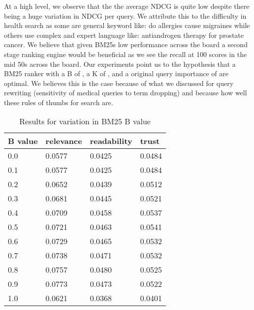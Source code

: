 \documentclass[11pt]{article}
\begin{document}
At a high level, we observe that the the average NDCG is quite low despite there being a huge variation in NDCG per query. We attribute this to the difficulty in health search as some are general keyword like: do allergies cause migraines while others use complex and expert language like: antiandrogen therapy for prostate cancer. We believe that given BM25s low performance across the board a second stage ranking engine would be beneficial as we see the recall at 100 scores in the mid 50s across the board. Our experiments point us to the hypothesis that a BM25 ranker with a B of {}, a K of {}, and a original query importance of {} are optimal. We believes this is the case because of what we discussed for query rewriting (sensitivity of medical queries to term dropping) and because how well these rules of thumbs for search are. 
\begin{table}[]
\begin{tabular}{|l|l|l|l|} \hline
B value  & relevance & readability & trust  \\ \hline
0.0 & 0.0577    & 0.0425     & 0.0484 \\ \hline
0.1 & 0.0577    & 0.0425     & 0.0484 \\\hline
0.2 & 0.0652    & 0.0439     & 0.0512 \\\hline
0.3 & 0.0681    & 0.0445     & 0.0521 \\\hline
0.4  & 0.0709    & 0.0458     & 0.0537 \\\hline
0.5 & 0.0721    & 0.0463     & 0.0541 \\\hline
0.6 & 0.0729    & 0.0465     & 0.0532 \\\hline
0.7 & 0.0738    & 0.0471     & 0.0532 \\\hline
0.8 & 0.0757    & 0.0480     & 0.0525 \\\hline
0.9 & 0.0773    & 0.0473     & 0.0522 \\\hline
1.0 & 0.0621    & 0.0368     & 0.0401 \\ \hline
\end{tabular}
\caption{Results for variation in BM25 B value}
\label{tab:vary-b}
\end{table}
\end{document}

